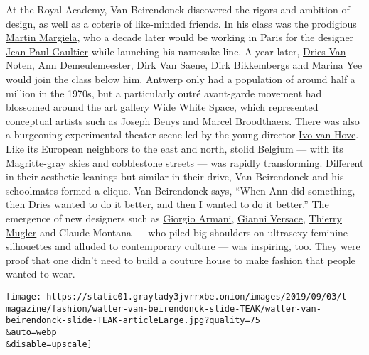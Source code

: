 At the Royal Academy, Van Beirendonck discovered the rigors and ambition
of design, as well as a coterie of like-minded friends. In his class was
the prodigious
\href{https://www.nytimes3xbfgragh.onion/2018/03/08/t-magazine/fashion/martin-margiela-history-fall-winter-2000-show.html}{Martin
Margiela}, who a decade later would be working in Paris for the designer
\href{https://www.nytimes3xbfgragh.onion/topic/person/jean-paul-gaultier}{Jean
Paul Gaultier} while launching his namesake line. A year later,
\href{https://www.nytimes3xbfgragh.onion/2017/10/16/t-magazine/dries-van-noten.html}{Dries
Van Noten}, Ann Demeulemeester, Dirk Van Saene, Dirk Bikkembergs and
Marina Yee would join the class below him. Antwerp only had a population
of around half a million in the 1970s, but a particularly outré
avant-garde movement had blossomed around the art gallery Wide White
Space, which represented conceptual artists such as
\href{https://www.nytimes3xbfgragh.onion/1986/01/25/obituaries/joseph-beuys-sculptor-is-dead-at-64.html}{Joseph
Beuys} and
\href{https://www.nytimes3xbfgragh.onion/2019/07/15/t-magazine/most-important-contemporary-art.html}{Marcel
Broodthaers}. There was also a burgeoning experimental theater scene led
by the young director
\href{https://www.nytimes3xbfgragh.onion/2018/11/20/t-magazine/rufus-wainwright-ivo-van-hove-conversation.html}{Ivo
van Hove}. Like its European neighbors to the east and north, stolid
Belgium --- with its
\href{https://www.nytimes3xbfgragh.onion/topic/person/rene-magritte}{Magritte}-gray
skies and cobblestone streets --- was rapidly transforming. Different in
their aesthetic leanings but similar in their drive, Van Beirendonck and
his schoolmates formed a clique. Van Beirendonck says, ``When Ann did
something, then Dries wanted to do it better, and then I wanted to do it
better.'' The emergence of new designers such as
\href{https://www.nytimes3xbfgragh.onion/2018/11/19/t-magazine/giorgio-armani-home-broni-italy.html}{Giorgio
Armani},
\href{https://www.nytimes3xbfgragh.onion/1997/07/16/style/gianni-versace-50-the-designer-who-infused-fashion-with-life-and-art.html}{Gianni
Versace},
\href{https://www.nytimes3xbfgragh.onion/2019/03/01/t-magazine/thierry-mugler-1995-show.html}{Thierry
Mugler} and Claude Montana --- who piled big shoulders on ultrasexy
feminine silhouettes and alluded to contemporary culture --- was
inspiring, too. They were proof that one didn't need to build a couture
house to make fashion that people wanted to wear.

\texttt{[image: https://static01.graylady3jvrrxbe.onion/images/2019/09/03/t-magazine/fashion/walter-van-beirendonck-slide-TEAK/walter-van-beirendonck-slide-TEAK-articleLarge.jpg?quality=75\\\&auto=webp\\\&disable=upscale]}

